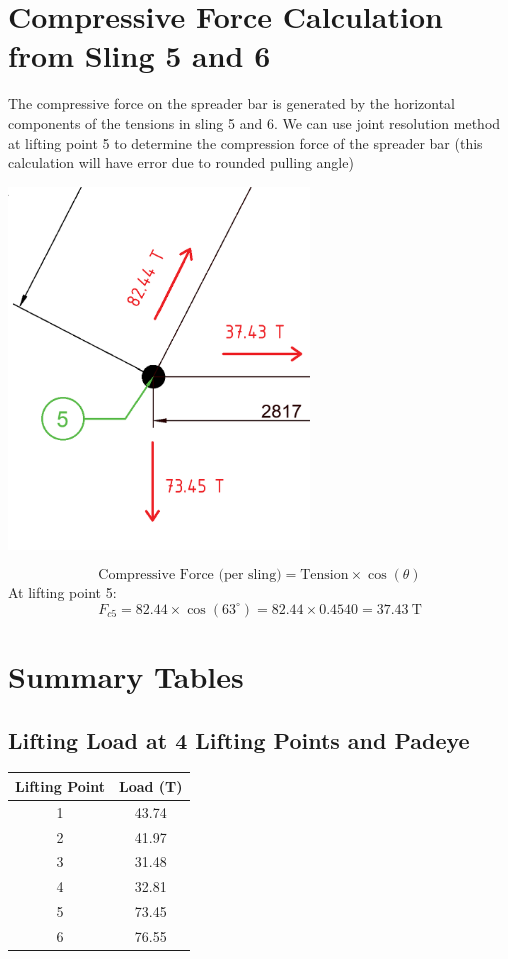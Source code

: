 \documentclass[12pt]{article}
\begin{document}
\section{Compressive Force Calculation from Sling 5 and 6}
The compressive force on the spreader bar is generated by the horizontal components of the tensions in sling 5 and 6. We can use joint resolution method at lifting point 5 to determine the compression force of the spreader bar (this calculation will have error due to rounded pulling angle)
\begin{center}
\includegraphics[width=0.6\textwidth]{joint5.png}
\end{center}
\[
\text{Compressive Force (per sling)} = \text{Tension} \times \cos(\theta)
\]
At lifting point 5:
\[
F_{c5} = 82.44 \times \cos(63^\circ) = 82.44 \times 0.4540 = 37.43~\text{T}
\]

\section{Summary Tables}
\subsection*{Lifting Load at 4 Lifting Points and Padeye}
\begin{center}
\begin{tabular}{|c|c|}
\hline
Lifting Point & Load (T) \\
\hline
1 & 43.74 \\
2 & 41.97 \\
3 & 31.48 \\
4 & 32.81 \\
5 & 73.45 \\
6 & 76.55 \\
\hline
\end{tabular}
\end{center}
\end{document}
